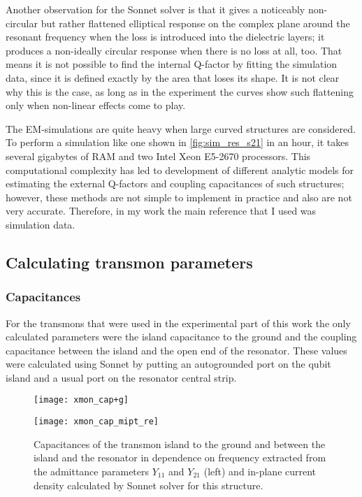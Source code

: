 Another observation for the Sonnet solver is that it gives a noticeably non-circular but rather flattened elliptical response on the complex plane around the resonant frequency when the loss is introduced into the dielectric layers; it produces a non-ideally circular response when there is no loss at all, too. That means it is not possible to find the internal Q-factor by fitting the simulation data, since it is defined exactly by the area that loses its shape. It is not clear why this is the case, as long as in the experiment the curves show such flattening only when non-linear effects come to play.\cite{astafiev2010}

The EM-simulations are quite heavy when large curved structures are considered. To perform a simulation like one shown in \autoref{fig:sim_res_s21} in an hour, it takes several gigabytes of RAM and two Intel Xeon E5-2670 processors. This computational complexity has led to development of different analytic models for estimating the external Q-factors and coupling capacitances of such structures\cite{martinis2014}; however, these methods are not simple to implement in practice and also are not very accurate. Therefore, in my work the main reference that I used was simulation data.

\subsection{Calculating transmon parameters}

\subsubsection{Capacitances}

For the transmons that were used in the experimental part of this work the only calculated parameters were the island capacitance to the ground and the coupling capacitance between the island and the open end of the resonator. These values were calculated using Sonnet by putting an autogrounded port on the qubit island and a usual port on the resonator central strip. 

\begin{figure}
\centering
\begin{minipage}{0.45\textwidth}
\texttt{[image: xmon\_cap+g]}
\end{minipage}\quad
\begin{minipage}{0.45\textwidth}
\texttt{[image: xmon\_cap\_mipt\_re]}

\vspace*{0.5cm}
\end{minipage}
\caption{Capacitances of the transmon island to the ground and between the island and the resonator in dependence on frequency extracted from the admittance parameters $Y_{11}$ and $Y_{21}$ (left) and in-plane current density calculated by Sonnet solver for this structure.}
\label{fig:xmon_cap}
\end{figure}

